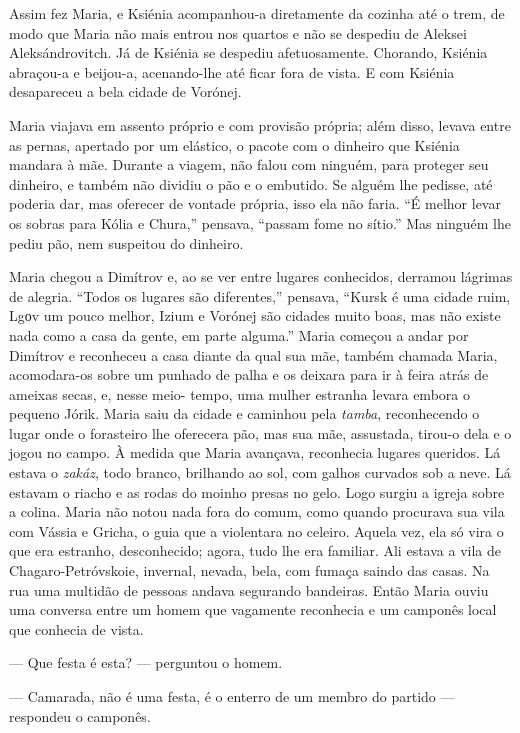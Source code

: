 Assim fez Maria, e Ksiénia acompanhou-a diretamente da cozinha até o
trem, de modo que Maria não mais entrou nos quartos e não se despediu de
Aleksei Aleksándrovitch. Já de Ksiénia se despediu afetuosamente.
Chorando, Ksiénia abraçou-a e beijou-a, acenando-lhe até ficar fora de
vista. E com Ksiénia desapareceu a bela cidade de Vorónej.

Maria viajava em assento próprio e com provisão própria; além disso,
levava entre as pernas, apertado por um elástico, o pacote com o
dinheiro que Ksiénia mandara à mãe. Durante a viagem, não falou com
ninguém, para proteger seu dinheiro, e também não dividiu o pão e o
embutido. Se alguém lhe pedisse, até poderia dar, mas oferecer de
vontade própria, isso ela não faria. ``É melhor levar os sobras para
Kólia e Chura,'' pensava, ``passam fome no sítio.'' Mas ninguém lhe
pediu pão, nem suspeitou do dinheiro.

Maria chegou a Dimítrov e, ao se ver entre lugares conhecidos, derramou
lágrimas de alegria. ``Todos os lugares são diferentes,'' pensava,
``Kursk é uma cidade ruim, Lgоv um pouco melhor, Izium e Vorónej são
cidades muito boas, mas não existe nada como a casa da gente, em parte
alguma.'' Maria começou a andar por Dimítrov e reconheceu a casa diante
da qual sua mãe, também chamada Maria, acomodara-os sobre um punhado de
palha e os deixara para ir à feira atrás de ameixas secas, e, nesse
meio- tempo, uma mulher estranha levara embora o pequeno Jórik. Maria
saiu da cidade e caminhou pela \emph{tamba}, reconhecendo o lugar onde o
forasteiro lhe oferecera pão, mas sua mãe, assustada, tirou-o dela e o
jogou no campo. À medida que Maria avançava, reconhecia lugares
queridos. Lá estava o \emph{zakáz}, todo branco, brilhando ao sol, com
galhos curvados sob a neve. Lá estavam o riacho e as rodas do moinho
presas no gelo. Logo surgiu a igreja sobre a colina. Maria não notou
nada fora do comum, como quando procurava sua vila com Vássia e Gricha,
o guia que a violentara no celeiro. Aquela vez, ela só vira o que era
estranho, desconhecido; agora, tudo lhe era familiar. Ali estava a vila
de Chagaro-Petróvskoie, invernal, nevada, bela, com fumaça saindo das
casas. Na rua uma multidão de pessoas andava segurando bandeiras. Então
Maria ouviu uma conversa entre um homem que vagamente reconhecia e um
camponês local que conhecia de vista.

--- Que festa é esta? --- perguntou o homem.

--- Camarada, não é uma festa, é o enterro de um membro do partido ---
respondeu o camponês.

